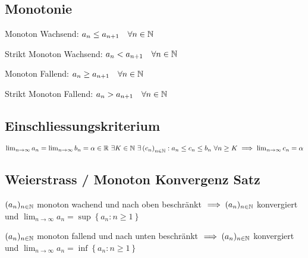 \subsection{Monotonie}
\begin{compactdesc}
    \item[Monoton Wachsend:] $a_n \le a_{n+1} \quad \forall n \in \mathbb{N}$
    \item[Strikt Monoton Wachsend:] $a_n < a_{n+1} \quad \forall n \in \mathbb{N}$
    \item[Monoton Fallend:] $a_n \ge a_{n+1} \quad \forall n \in \mathbb{N}$
    \item[Strikt Monoton Fallend:] $a_n > a_{n+1} \quad \forall n \in \mathbb{N}$
\end{compactdesc}

\subsection{Einschliessungskriterium}
    $\lim_{n \to \infty} a_n = \lim_{n \to \infty} b_n = \alpha \in \mathbb{R} \ \exists K \in \mathbb{N} \ \exists \left( c_n \right)_{n \in \mathbb{N}}: a_n \le  c_n \le b_n \ \forall n \ge K \implies \lim_{n \to \infty} c_n = \alpha$

\subsection{Weierstrass / Monoton Konvergenz Satz}
\begin{compactitem}
   \item $(a_n)_{n \in \mathbb{N}}$ monoton wachend und nach oben beschränkt $\implies (a_n)_{n \in \mathbb{N}}$ konvergiert und $\lim_{n \to \infty} a_n = \sup \left\{ a_n : n \ge 1 \right\}$
   \item $(a_n)_{n \in \mathbb{N}}$ monoton fallend und nach unten beschränkt $\implies (a_n)_{n \in \mathbb{N}}$ konvergiert und $\lim_{n \to \infty} a_n = \inf \left\{ a_n : n \ge 1 \right\}$
\end{compactitem}

